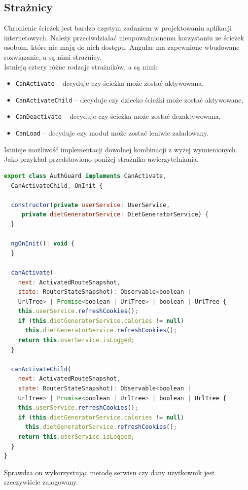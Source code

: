   \subsection{Strażnicy}
  Chronienie ścieżek jest bardzo częstym zadaniem w projektowaniu aplikacji internetowych. Należy przeciwdziałać nieupoważnionemu korzystaniu ze ścieżek osobom, które nie mają do nich dostępu. Angular ma zapewnione wbudowane rozwiązanie, a są nimi strażnicy.\cite{angulararch}\\
  Istnieją cztery różne rodzaje strażników, a są nimi:
  \begin{itemize}
      \item \texttt{CanActivate} -- decyduje czy ścieżka może zostać aktywowana,
      \item \texttt{CanActivateChild} -- decyduje czy dziecko ścieżki może zostać aktywowane,
      \item \texttt{CanDeactivate} -- decyduje czy ścieżka może zostać dezaktywowana,
      \item \texttt{CanLoad} -- decyduje czy moduł może zostać leniwie załadowany.
  \end{itemize}
  Istnieje możliwość implementacji dowolnej kombinacji z wyżej wymienionych.\\
  Jako przykład przedstawiono poniżej strażnika uwierzytelniania.
  \begin{lstlisting}[language=JavaScript] 
  export class AuthGuard implements CanActivate,
  CanActivateChild, OnInit {

  constructor(private userService: UserService,
     private dietGeneratorService: DietGeneratorService) {
  }

  ngOnInit(): void {
  }

  canActivate(
    next: ActivatedRouteSnapshot,
    state: RouterStateSnapshot): Observable<boolean |
    UrlTree> | Promise<boolean | UrlTree> | boolean | UrlTree {
    this.userService.refreshCookies();
    if (this.dietGeneratorService.calories != null)
      this.dietGeneratorService.refreshCookies();
    return this.userService.isLogged;
  }

  canActivateChild(
    next: ActivatedRouteSnapshot,
    state: RouterStateSnapshot): Observable<boolean |
    UrlTree> | Promise<boolean | UrlTree> | boolean | UrlTree {
    this.userService.refreshCookies();
    if (this.dietGeneratorService.calories != null)
      this.dietGeneratorService.refreshCookies();
    return this.userService.isLogged;
  }
}
  \end{lstlisting}
  Sprawdza on wykorzystując metodę serwisu czy dany użytkownik jest rzeczywiście zalogowany.
